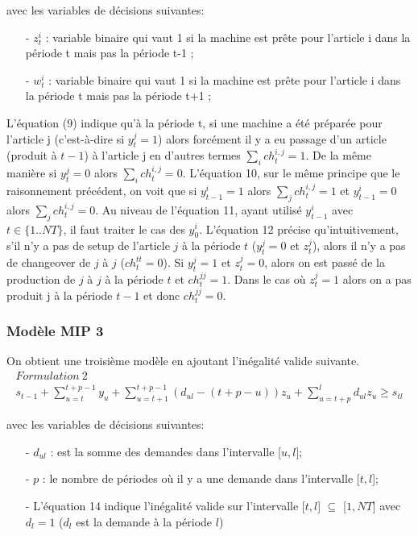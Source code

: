 \documentclass[12pt,a4paper]{article}
\begin{document}
		avec les variables de décisions suivantes: \\
		\begin{itemize}
			\item[-] $z_{t}^{i}$ : variable binaire qui vaut 1 si la machine est prête pour l'article i dans la période t mais pas la période t-1 ;
			\item[-] $w_{t}^{i}$ : variable binaire qui vaut 1 si la machine est prête pour l'article i dans la période t mais pas la période t+1 ;
		\end{itemize}
		\vspace*{.3cm}
		\hspace*{.5cm} L'équation (9) indique qu'à la période t, si une machine a été préparée pour l'article j (c’est-à-dire si $y_{t}^{j} = 1$) alors forcément il y a eu passage d’un article (produit à $t-1$) à l’article j en d’autres termes $\sum_{i} ch_{t}^{i,j} = 1$. De la même manière si $y_{t}^{j} = 0$ alors $\sum_{i} ch_{t}^{i,j} = 0$. L'équation 10, sur le même principe que le raisonnement précédent, on voit que si $y_{t-1}^{i} = 1$ alors $ \sum_{j} ch_{t}^{i,j} = 1$ et $y_{t-1}^{i} = 0$ alors $ \sum_{j} ch_{t}^{i,j} = 0$. Au niveau de l'équation 11, ayant utilisé $y_{t-1}^{i}$ avec $t \in \{1..NT\}$, il faut traiter le cas des $y_{0}^{i}$. L'équation 12 précise qu'intuitivement, s’il n’y a pas de setup de l’article $j$ à la période $t$ ($y_{t}^{j}=0$ et $z_{t}^{j}$), alors il n'y a pas de changeover de $j$ à $j$ ($ch_{t}^{tt} = 0$). Si $y_{t}^{j} = 1$ et $z_{t}^{j} = 0$, alors on est passé de la production de $j$ à $j$ à la période $t$ et $ch_{t}^{jj} = 1$. Dans le cas où $z_{t}^{j} = 1$ alors on a pas produit j à la période $t-1$ et donc $ch_{t}^{jj} = 0$. 
		
		\subsubsection{Modèle MIP 3}
		On obtient une troisième modèle en ajoutant l'inégalité valide suivante.
		\begin{eqnarray}
			Formulation \  2 \\
			s_{t-1} + \sum_{u=t}^{t+p-1} y_{u} + \sum_{u=t+1}^{t+p-1} (d_{ul}-(t+p-u))z_{u} + \sum_{u=t+p}^{l} d_{ul}z_{u} \geq s_{tl}
		\end{eqnarray}
		
		avec les variables de décisions suivantes: \\
		\begin{itemize}
			\item[-] $d_{ul}$ : est la somme des demandes dans l'intervalle [$u,l$];
			\item[-] $p$ :  le nombre de périodes où il y a une demande dans l'intervalle [$t,l$];
			\item[-] L'équation 14 indique l'inégalité valide sur l'intervalle [$t,l$] $\subseteq$ [$1,NT$] avec $d_{l}=1$ ($d_{l}$ est la demande à la période $l$)
		\end{itemize}
\end{document}

